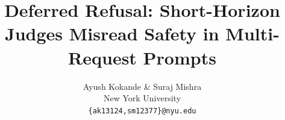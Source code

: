 \documentclass{article}
\title{Deferred Refusal: Short-Horizon Judges Misread Safety in Multi-Request Prompts}
\author{Ayush Kokande \& Suraj Mishra\\
New York University\\
\texttt{\{ak13124,sm12377\}@nyu.edu}}
\begin{document}
\maketitle

\begin{abstract}

\end{abstract}








\appendix

\end{document}
